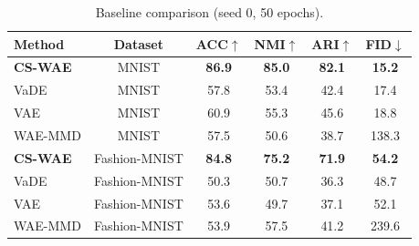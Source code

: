 \begin{table}[t]
\centering
\caption{Baseline comparison (seed 0, 50 epochs).}
\label{tab:baselines}
\begin{tabular}{lccccc}
\toprule
Method & Dataset & ACC$\uparrow$ & NMI$\uparrow$ & ARI$\uparrow$ & FID$\downarrow$ \\
\midrule
\textbf{CS-WAE} & MNIST & \textbf{86.9} & \textbf{85.0} & \textbf{82.1} & \textbf{15.2} \\
VaDE & MNIST & 57.8 & 53.4 & 42.4 & 17.4 \\
VAE & MNIST & 60.9 & 55.3 & 45.6 & 18.8 \\
WAE-MMD & MNIST & 57.5 & 50.6 & 38.7 & 138.3 \\
\textbf{CS-WAE} & Fashion-MNIST & \textbf{84.8} & \textbf{75.2} & \textbf{71.9} & \textbf{54.2} \\
VaDE & Fashion-MNIST & 50.3 & 50.7 & 36.3 & 48.7 \\
VAE & Fashion-MNIST & 53.6 & 49.7 & 37.1 & 52.1 \\
WAE-MMD & Fashion-MNIST & 53.9 & 57.5 & 41.2 & 239.6 \\
\bottomrule
\end{tabular}
\end{table}